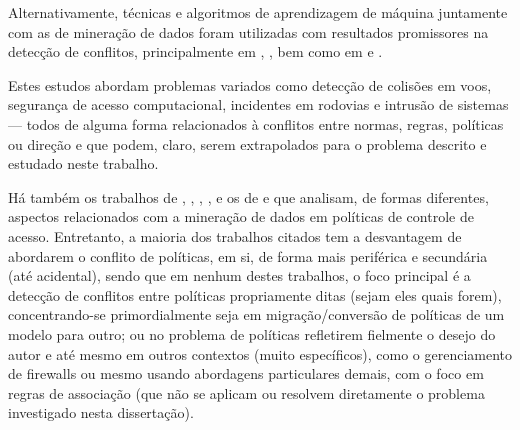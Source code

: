 \documentclass[
	12pt,				%
	openright,			%
	oneside,			%
	a4paper,			%
	english,			%
	french,				%
	spanish,			%
	brazil				%
	]{abntex2}
\begin{document}
Alternativamente, técnicas e algoritmos de aprendizagem de máquina juntamente com as de mineração de dados foram utilizadas com resultados promissores na detecção de conflitos, principalmente em , , bem como em  e . 

Estes estudos abordam problemas variados como detecção de colisões em voos, segurança de acesso computacional, incidentes em rodovias e intrusão de sistemas — todos de alguma forma relacionados à conflitos entre normas, regras, políticas ou direção e que podem, claro, serem extrapolados para o problema descrito e estudado neste trabalho.

Há também os trabalhos de , , , ,  e os de  e  que analisam, de formas diferentes, aspectos relacionados com a mineração de dados em políticas de controle de acesso. Entretanto, a maioria dos trabalhos citados tem a desvantagem de abordarem o conflito de políticas, em si, de forma mais periférica e secundária (até acidental), sendo que em nenhum destes trabalhos, o foco principal é a detecção de conflitos entre políticas propriamente ditas (sejam eles quais forem), concentrando-se primordialmente seja em migração/conversão de políticas de um modelo para outro; ou no problema de políticas refletirem fielmente o desejo do autor e até mesmo em outros contextos (muito específicos), como o gerenciamento de firewalls ou mesmo usando abordagens particulares demais, com o foco em regras de associação (que não se aplicam ou resolvem diretamente o problema investigado nesta dissertação).
\end{document}

